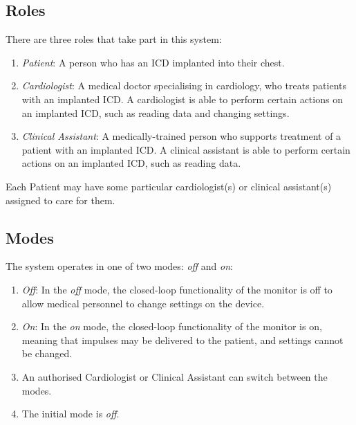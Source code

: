 \documentclass[11pt]{article}
\begin{document}
\subsection{Roles}

There are three roles that take part in this system:

\begin{enumerate}

 \item \emph{Patient}: A person who has an ICD implanted into their chest.

 \item \emph{Cardiologist}: A medical doctor specialising in cardiology, who treats patients with an implanted ICD. A cardiologist is able to perform certain actions on an implanted ICD, such as reading data and changing settings.

 \item \emph{Clinical Assistant}: A medically-trained person who supports treatment of a patient with an implanted ICD. A clinical assistant is able to perform certain actions on an implanted ICD, such as reading data.

\end{enumerate}
Each Patient may have some particular cardiologist(s) or clinical assistant(s) assigned to care for them.

\subsection{Modes}

The system operates in one of two modes: \emph{off} and \emph{on}:

\begin{enumerate}[~~\bf{R1}.1]

  \item \emph{Off}: In the \emph{off} mode, the closed-loop functionality of the monitor is off to allow medical personnel to change settings on the device. 

  \item \emph{On}: In the \emph{on} mode, the closed-loop functionality of the monitor is on, meaning that impulses may be delivered to the patient, and settings cannot be changed.

  \item An authorised Cardiologist or Clinical Assistant can switch between the modes. 


  \item The initial mode is \emph{off}.

\end{enumerate}
\end{document}
